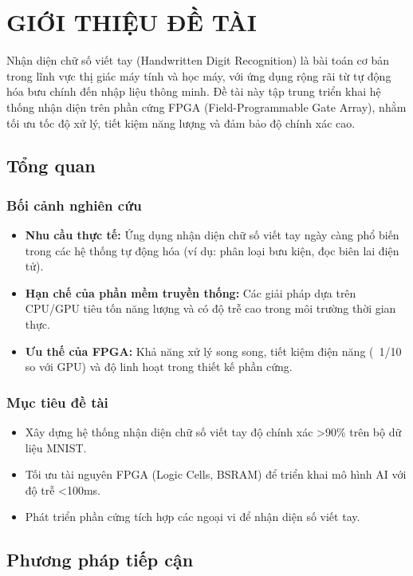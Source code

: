 \section{GIỚI THIỆU ĐỀ TÀI}
Nhận diện chữ số viết tay (Handwritten Digit Recognition) là bài toán cơ bản trong lĩnh vực thị giác máy tính và học máy, với ứng dụng rộng rãi từ tự động hóa bưu chính đến nhập liệu thông minh. Đề tài này tập trung triển khai hệ thống nhận diện trên phần cứng FPGA (Field-Programmable Gate Array), nhằm tối ưu tốc độ xử lý, tiết kiệm năng lượng và đảm bảo độ chính xác cao.

\subsection{Tổng quan}
\subsubsection{Bối cảnh nghiên cứu}
\begin{itemize}
    \item \textbf{Nhu cầu thực tế:} Ứng dụng nhận diện chữ số viết tay ngày càng phổ biến trong các hệ thống tự động hóa (ví dụ: phân loại bưu kiện, đọc biên lai điện tử).
    \item \textbf{Hạn chế của phần mềm truyền thống:} Các giải pháp dựa trên CPU/GPU tiêu tốn năng lượng và có độ trễ cao trong môi trường thời gian thực.
    \item \textbf{Ưu thế của FPGA:} Khả năng xử lý song song, tiết kiệm điện năng (~1/10 so với GPU) và độ linh hoạt trong thiết kế phần cứng.
\end{itemize}

\subsubsection{Mục tiêu đề tài}
\begin{itemize}
    \item Xây dựng hệ thống nhận diện chữ số viết tay độ chính xác >90\% trên bộ dữ liệu MNIST.
    \item Tối ưu tài nguyên FPGA (Logic Cells, BSRAM) để triển khai mô hình AI với độ trễ <100ms.
    \item Phát triển phần cứng tích hợp các ngoại vi để nhận diện số viết tay.
\end{itemize}

\subsection{Phương pháp tiếp cận}

